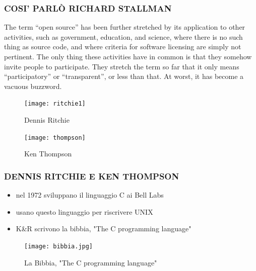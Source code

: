 \documentclass{beamer}
\begin{document}
\begin{frame}
    \frametitle{COSI' PARLÒ RICHARD STALLMAN}
        The term “open source” has been further stretched by its application to other activities, such as government, education, and science, where there is no such thing as source code, and where criteria for software licensing are simply not pertinent. The only thing these activities have in common is that they somehow invite people to participate. They stretch the term so far that it only means “participatory” or “transparent”, or less than that. At worst, it has become a vacuous buzzword.
\end{frame}

\begin{frame}
\end{frame}

\begin{frame}
    \begin{figure}
        \texttt{[image: ritchie1]}
        \caption{Dennis Ritchie}
    \end{figure}
\end{frame}
\begin{frame}
    \begin{figure}
        \texttt{[image: thompson]}
        \caption{Ken Thompson}
    \end{figure}
\end{frame}


\begin{frame}
    \frametitle{DENNIS RITCHIE E KEN THOMPSON}
        \begin{itemize}
            \item nel 1972 sviluppano il linguaggio C ai Bell Labs
            \item usano questo linguaggio per riscrivere UNIX 
            \item K\&R scrivono la bibbia, "The C programming language"
        \end{itemize}
\end{frame}

\begin{frame}
    \begin{figure}
        \texttt{[image: bibbia.jpg]}
        \caption{La Bibbia, "The C programming language"}
    \end{figure}
\end{frame}
\end{document}

